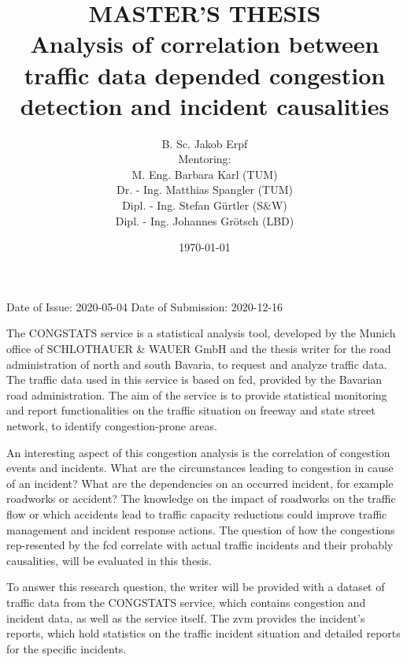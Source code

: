 \documentclass[a4paper,12pt]{report}
\begin{document}
\title{MASTER'S THESIS\\
[1cm]
\smaller Analysis of correlation between traffic data depended congestion detection and incident causalities}
\author{
B. Sc. Jakob Erpf\\ 
[1cm]
\small Mentoring:\\ 
\small M. Eng. Barbara Karl (TUM)\\ 
\small Dr. - Ing. Matthias Spangler (TUM)\\ 
\small Dipl. - Ing. Stefan Gürtler (S\&W)\\
\small Dipl. - Ing. Johannes Grötsch (LBD)
}
\date{\today}
\maketitle
\clearpage
\renewcommand\abstractname{Topic}
\abstract{}
Date of Issue: 2020-05-04\newline
Date of Submission:	2020-12-16\newline
\newline
\par The CONGSTATS service is a statistical analysis tool, developed by the Munich office of SCHLOTHAUER \& WAUER GmbH and the thesis writer for the road administration of north and south Bavaria, to request and analyze traffic data. The traffic data used in this service is based on \acrfull{fcd}, provided by the Bavarian road administration. The aim of the service is to provide statistical monitoring and report functionalities on the traffic situation on freeway and state street network, to identify congestion-prone areas.
\par An interesting aspect of this congestion analysis is the correlation of congestion events and incidents. What are the circumstances leading to congestion in cause of an incident? What are the dependencies on an occurred incident, for example roadworks or accident? The knowledge on the impact of roadworks on the traffic flow or which accidents lead to traffic capacity reductions could improve traffic management and incident response actions. The question of how the congestions rep-resented by the \acrshort{fcd} correlate with actual traffic incidents and their probably causalities, will be evaluated in this thesis. 
\par To answer this research question, the writer will be provided with a dataset of traffic data from the CONGSTATS service, which contains congestion and incident data, as well as the service itself. The \acrfull{zvm} provides the incident’s reports, which hold statistics on the traffic incident situation and detailed reports for the specific incidents.
\end{document}
